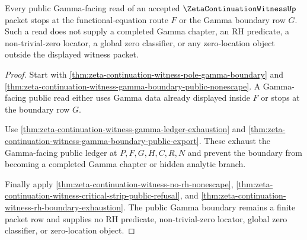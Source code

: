 \begin{theorem}
\label{thm:zeta-continuation-witness-gamma-public-boundary-lock}
Every public Gamma-facing read of an accepted $\ZetaContinuationWitnessUp$ packet stops at the functional-equation route $F$ or the Gamma boundary row $G$. Such a read does not supply a completed Gamma chapter, an RH predicate, a non-trivial-zero locator, a global zero classifier, or any zero-location object outside the displayed witness packet.
\end{theorem}
\begin{proof}
Start with \autoref{thm:zeta-continuation-witness-pole-gamma-boundary} and \autoref{thm:zeta-continuation-witness-gamma-boundary-public-nonescape}. A Gamma-facing public read either uses Gamma data already displayed inside $F$ or stops at the boundary row $G$.

Use \autoref{thm:zeta-continuation-witness-gamma-ledger-exhaustion} and \autoref{thm:zeta-continuation-witness-gamma-boundary-public-export}. These exhaust the Gamma-facing public ledger at $P,F,G,H,C,R,N$ and prevent the boundary from becoming a completed Gamma chapter or hidden analytic branch.

Finally apply \autoref{thm:zeta-continuation-witness-no-rh-nonescape}, \autoref{thm:zeta-continuation-witness-critical-strip-public-refusal}, and \autoref{thm:zeta-continuation-witness-rh-boundary-exhaustion}. The public Gamma boundary remains a finite packet row and supplies no RH predicate, non-trivial-zero locator, global zero classifier, or zero-location object.
\end{proof}
